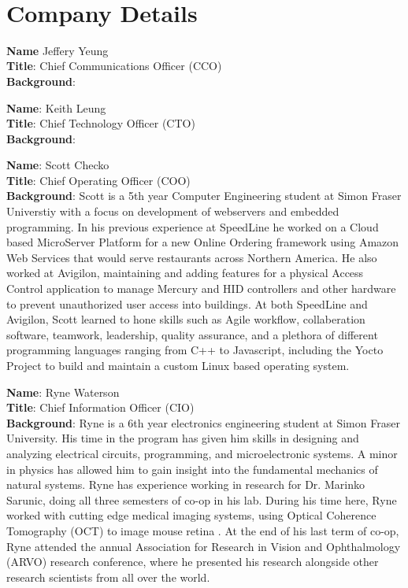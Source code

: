 

\setcounter{section}{5}
\
\section{Company Details}

\bigskip
\textbf{Name} Jeffery Yeung \\
\medskip
\textbf{Title}: Chief Communications Officer (CCO)\\
\medskip
\textbf{Background}:

\bigskip
\bigskip
\textbf{Name}:  Keith Leung\\
\medskip
\textbf{Title}: Chief Technology Officer (CTO) \\
\medskip
\textbf{Background}:

\bigskip
\bigskip
\textbf{Name}: Scott Checko\\
\medskip
\textbf{Title}: Chief Operating Officer (COO)\\
\medskip
\textbf{Background}:
Scott is a 5th year Computer Engineering student at Simon Fraser Universtiy with a focus on development of webservers and embedded programming.
In his previous experience at SpeedLine he worked on a Cloud based MicroServer Platform for a new Online Ordering framework using Amazon Web Services that would serve restaurants across Northern America.
He also worked at Avigilon, maintaining and adding features for a physical Access Control application to manage Mercury and HID controllers and other hardware to prevent unauthorized user access into buildings.
At both SpeedLine and Avigilon, Scott learned to hone skills such as Agile workflow, collaberation software, teamwork, leadership, quality assurance, and a plethora of different programming languages ranging from C++ to Javascript, including the Yocto Project to build and maintain a custom Linux based operating system.


\pagebreak
\textbf{Name}: Ryne Waterson\\
\medskip
\textbf{Title}: Chief Information Officer (CIO)\\
\medskip
\textbf{Background}: Ryne is a 6th year electronics engineering student at Simon Fraser University. His time in the program has given him skills in designing and analyzing electrical circuits, programming, and microelectronic systems. A minor in physics has allowed him to gain insight into the fundamental mechanics of natural systems. Ryne has experience working in research for Dr. Marinko Sarunic, doing all three semesters of co-op in his lab. During his time here, Ryne worked with cutting edge medical imaging systems, using Optical Coherence Tomography (OCT) to image mouse retina . At the end of his last term of co-op, Ryne attended the annual Association for Research in Vision and Ophthalmology (ARVO) research conference, where he presented his research alongside other research scientists from all over the world.  

